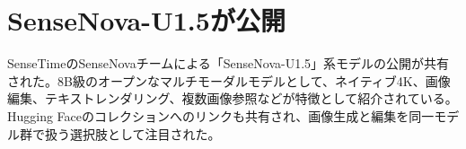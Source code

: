 \section{SenseNova-U1.5が公開}
SenseTimeのSenseNovaチームによる「SenseNova-U1.5」系モデルの公開が共有された。8B級のオープンなマルチモーダルモデルとして、ネイティブ4K、画像編集、テキストレンダリング、複数画像参照などが特徴として紹介されている。Hugging Faceのコレクションへのリンクも共有され、画像生成と編集を同一モデル群で扱う選択肢として注目された。

